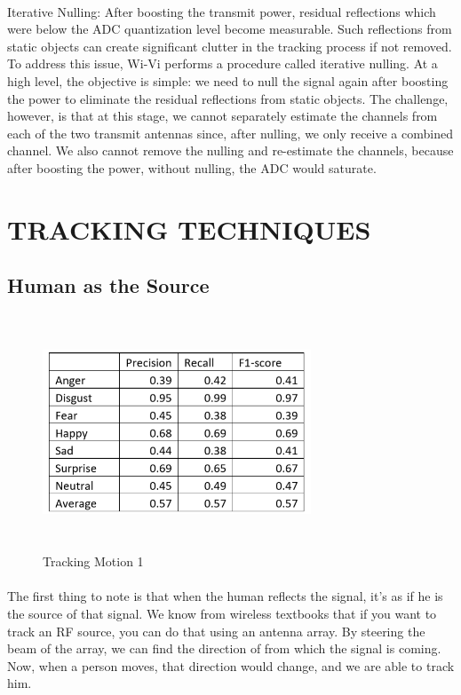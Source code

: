 \documentclass[a4paper,12pt,oneside]{article}
\begin{document}
\paragraph{}
Iterative Nulling: After boosting the transmit power, residual reflections which were below the
ADC quantization level become measurable. Such reflections from static objects can create
significant clutter in the tracking process if not removed. To address this issue, Wi-Vi performs a
procedure called iterative nulling. At a high level, the objective is simple: we need to null the
signal again after boosting the power to eliminate the residual reflections from static objects. The
challenge, however, is that at this stage, we cannot separately estimate the channels from each of
the two transmit antennas since, after nulling, we only receive a combined channel. We also
cannot remove the nulling and re-estimate the channels, because after boosting the power,
without nulling, the ADC would saturate.

\newpage
\section{TRACKING TECHNIQUES}

\subsection{Human as the Source}

\begin{figure}[H]
\centering
\includegraphics[height=7cm,width=8cm]{10.png}
\caption{Tracking Motion 1}
\end{figure}

\paragraph{}
The first thing to note is that when the human reflects the signal, it’s as if he is the source
of that signal. We know from wireless textbooks that if you want to track an RF source, you can
do that using an antenna array. By steering the beam of the array, we can find the direction of
from which the signal is coming. Now, when a person moves, that direction would change, and
we are able to track him.
\end{document}
